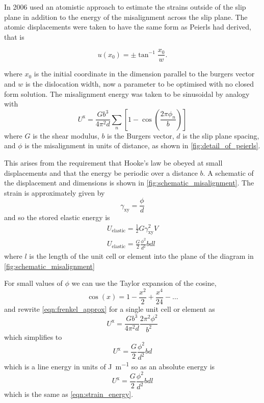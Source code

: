 In 2006 \citet{Clegg2006} used an atomistic approach to estimate the strains outside of the slip plane in addition to the energy of the misalignment across the slip plane. The atomic displacements were taken to have the same form as Peierls had derived, that is

\begin{equation}
u(x_0) = \pm \tan^{-1}\frac{x_0}{w}.
\end{equation}

where $x_0$ is the initial coordinate in the dimension parallel to the burgers vector and $w$ is the dislocation width, now a parameter to be optimised with no closed form solution. The misalignment energy was taken to be sinusoidal by analogy with \citet{Frenkel1926}
\begin{equation}
U^{\text{x}} = \frac{Gb^3}{4\pi^2 d} \sum_n \left[ 1 - \cos \left(\frac{2\pi \phi_n}{b} \right)\right] \label{eqn:frenkel_approx}
\end{equation}
where $G$ is the shear modulus, $b$ is the Burgers vector, $d$ is the slip plane spacing, and $\phi$ is the misalignment in units of distance, as shown in \autoref{fig:detail_of_peierls}.



This arises from the requirement that Hooke's law be obeyed at small displacements and that the energy be periodic over a distance $b$. A schematic of the displacement and dimensions is shown in \autoref{fig:schematic_misalignment}.
The strain is approximately given by 
\begin{equation}
\gamma_{\text{xy}} = \frac{\phi}{d}
\end{equation}
and so the stored elastic energy is 
\begin{align}
U_{\text{elastic}} = \frac{1}{2} G \gamma_{\text{xy}}^2 V \nonumber\\
U_{\text{elastic}} = \frac{G}{2} \frac{\phi^2}{d^2} b d l \label{eqn:strain_energy}
\end{align}
where $l$ is the length of the unit cell or element into the plane of the diagram in \autoref{fig:schematic_misalignment}

For small values of $\phi$ we can use the Taylor expansion of the cosine,
\begin{equation}
\cos(x) = 1 - \frac{x^2}{2} + \frac{x^4}{24} - \dots
\end{equation}
and rewrite \autoref{eqn:frenkel_approx} for a single unit cell or element as
\begin{equation}
U^{\text{x}} = \frac{Gb^3}{4\pi^2 d} \frac{2 \pi^2 \phi^2}{b^2}
\end{equation}
which simplifies to 
\begin{equation}
U^{\text{x}} = \frac{G}{2} \frac{\phi^2}{d^2} b d
\end{equation}
which is a line energy in units of \si{\joule\per\meter} so as an absolute energy is
\begin{equation}
U^{\text{x}} = \frac{G}{2} \frac{\phi^2}{d^2} b d l
\end{equation}
which is the same as \autoref{eqn:strain_energy}.









